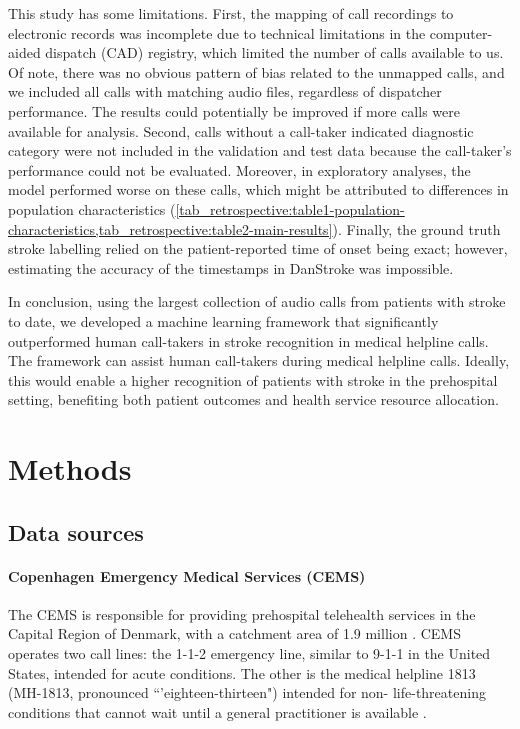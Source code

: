 {This study has some limitations. First, the mapping of call recordings to electronic records was incomplete due to technical limitations in the computer-aided dispatch (CAD) registry, which limited the number of calls available to us. Of note, there was no obvious pattern of bias related to the unmapped calls, and we included all calls with matching audio files, regardless of dispatcher performance. The results could potentially be improved if more calls were available for analysis. Second, calls without a call-taker indicated diagnostic category were not included in the validation and test data because the call-taker's performance could not be evaluated. Moreover, in exploratory analyses, the model performed worse on these calls, which might be attributed to differences in population characteristics (\cref{tab_retrospective:table1-population-characteristics,tab_retrospective:table2-main-results}). Finally, the ground truth stroke labelling relied on the patient-reported time of onset being exact; however, estimating the accuracy of the timestamps in DanStroke was impossible.

In conclusion, using the largest collection of audio calls from patients with stroke to date, we developed a machine learning framework that significantly outperformed human call-takers in stroke recognition in medical helpline calls. The framework can assist human call-takers during medical helpline calls. Ideally, this would enable a higher recognition of patients with stroke in the prehospital setting, benefiting both patient outcomes and health service resource allocation.


\section{Methods}

\subsection{Data sources}

\paragraph{Copenhagen Emergency Medical Services (CEMS)}

The CEMS is responsible for providing prehospital telehealth services in the Capital Region of Denmark, with a catchment area of 1.9 million \parencite{cite17}. CEMS operates two call lines: the 1-1-2 emergency line, similar to 9-1-1 in the United States, intended for acute conditions. The other is the medical helpline 1813 (MH-1813, pronounced ``'eighteen-thirteen") intended for non- life-threatening conditions that cannot wait until a general practitioner is available \parencite{cite18}.

}
